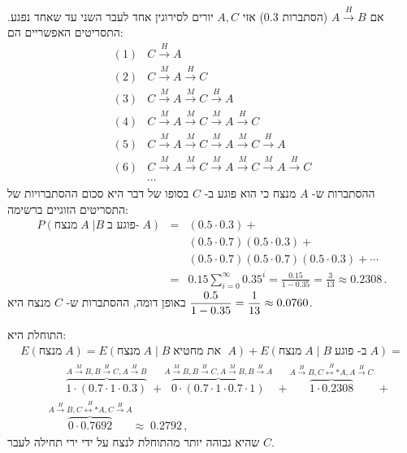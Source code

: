 אם
$A\stackrel{H}{\longrightarrow}B$
(הסתברות
$0.3$)
אזי
$A,C$
יורים לסירוגין אחד לעבר השני עד שאחד נפגע. התסריטים האפשריים הם:
\[
\begin{array}{ll}
(1)&C\stackrel{H}{\longrightarrow}A\\
(2)&C\stackrel{M}{\longrightarrow}A \stackrel{H}{\longrightarrow}C\\
(3)&C\stackrel{M}{\longrightarrow}A \stackrel{M}{\longrightarrow}C\stackrel{H}{\longrightarrow}A\\
(4)&C\stackrel{M}{\longrightarrow}A \stackrel{M}{\longrightarrow}C\stackrel{M}{\longrightarrow}A\stackrel{H}{\longrightarrow}C\\
(5)&C\stackrel{M}{\longrightarrow}A \stackrel{M}{\longrightarrow}C\stackrel{M}{\longrightarrow}A\stackrel{M}{\longrightarrow}C\stackrel{H}{\longrightarrow}A\\
(6)&C\stackrel{M}{\longrightarrow}A \stackrel{M}{\longrightarrow}C\stackrel{M}{\longrightarrow}A\stackrel{M}{\longrightarrow}C\stackrel{M}{\longrightarrow}A\stackrel{H}{\longrightarrow}C\\
&\cdots
\end{array}
\]
ההסתברות ש-%
$A$
מנצח כי הוא פוגע ב-%
$C$
בסופו של דבר היא סכום ההסתברויות של התסריטים הזוגיים ברשימה:
\begin{eqnarray*}
P(\textrm{מנצח} \;A\;| B\;\textrm{פוגע ב-}\;A )&=&(0.5 \cdot 0.3) + \\
&&(0.5 \cdot 0.7) (0.5 \cdot 0.3) + \\
&&(0.5 \cdot 0.7) (0.5 \cdot 0.7) (0.5 \cdot 0.3)+ \cdots\\
&=&0.15 \sum_{i=0}^{\infty} 0.35^i= \frac{0.15}{1-0.35}=\frac{3}{13}\approx 0.2308\,.
\end{eqnarray*}
באופן דומה, ההסתברות ש-%
$C$
מנצח היא
$\displaystyle\frac{0.5}{1-0.35}=\displaystyle\frac{1}{13}\approx 0.0760$.

התוחלת היא:
\vspace*{-4ex}
\[
\renewcommand*{\arraystretch}{2.5}
\begin{array}{l}
E(\textrm{מנצח}\;A) =E(\textrm{מנצח}\;A\;|\;B\;\textrm{את מחטיא }\;A) + E(\textrm{מנצח}\;A\;|\;B\;\textrm{ב- פוגע}\;A)=\\
\qquad\qquad
\overbrace{1\cdot (0.7\cdot 1\cdot 0.3)}%
^{A\stackrel{M}{\longrightarrow}B, B\stackrel{H}{\longrightarrow}C, A\stackrel{H}{\longrightarrow}B}\;+
%
\overbrace{0\cdot (0.7\cdot 1\cdot 0.7\cdot 1)}%
^{A\stackrel{M}{\longrightarrow}B,
B\stackrel{H}{\longrightarrow}C,
A\stackrel{M}{\longrightarrow}B,
B\stackrel{H}{\longrightarrow}A}\; +
%
\overbrace{1\cdot 0.2308}%
^{A\stackrel{H}{\longrightarrow}B,
C\stackrel{H}{\longleftrightarrow*}A,
A\stackrel{H}{\longrightarrow}C}\; +\\
%
\qquad\;\,\overbrace{0\cdot 0.7692}%
^{A\stackrel{H}{\longrightarrow}B,
C\stackrel{H}{\longleftrightarrow*}A,
C\stackrel{H}{\longrightarrow}A}
\approx \; 0.2792\,,
\end{array}
\]
שהיא גבוהה יותר מהתוחלת לנצח על ידי ירי תחילה לעבר 
$C$.

